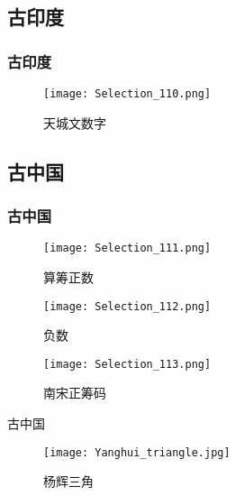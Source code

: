
\subsection{古印度}

\begin{frame}\frametitle{古印度}
	\begin{figure}\centering
		\texttt{[image: Selection\_110.png]}
		\caption{天城文数字}
	\end{figure}
\end{frame}

\subsection{古中国}

\begin{frame}\frametitle{古中国}
	\begin{figure}\centering
		\texttt{[image: Selection\_111.png]}
		\caption{算筹正数}
	\end{figure}\pause
	\begin{figure}\centering
		\texttt{[image: Selection\_112.png]}
		\caption{负数}
	\end{figure}\pause
	\begin{figure}\centering
		\texttt{[image: Selection\_113.png]}
		\caption{南宋正筹码}
	\end{figure}
\end{frame}

\begin{frame}{古中国}
	\begin{figure}
		\texttt{[image: Yanghui\_triangle.jpg]}
		\caption{杨辉三角}
	\end{figure}
\end{frame}